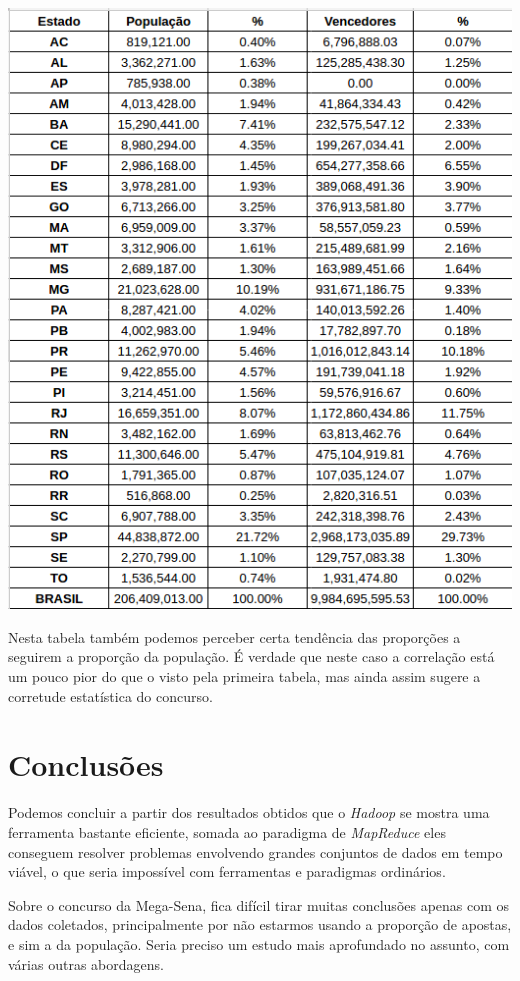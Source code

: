 \documentclass[a4paper,10pt]{article}
\begin{document}
\includegraphics[scale=0.5]{table2}

Nesta tabela também podemos perceber certa tendência das proporções a seguirem a proporção da população. É verdade que neste caso a correlação está um pouco pior do que o visto pela primeira tabela, mas ainda assim sugere a corretude estatística do concurso.


\section{Conclusões}
Podemos concluir a partir dos resultados obtidos que o \textit{Hadoop} se mostra uma ferramenta bastante eficiente, somada ao paradigma de \textit{MapReduce} eles conseguem resolver problemas envolvendo grandes conjuntos de dados em tempo viável, o que seria impossível com ferramentas e paradigmas ordinários.

Sobre o concurso da Mega-Sena, fica difícil tirar muitas conclusões apenas com os dados coletados, principalmente por não estarmos usando a proporção de apostas, e sim a da população. Seria preciso um estudo mais aprofundado no assunto, com várias outras abordagens.
\end{document}

